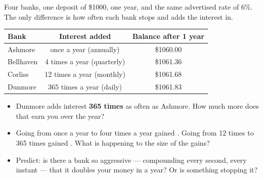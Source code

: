 \documentclass[10pt]{article}
\begin{document}
\begin{hookbox}
Four banks, one deposit of \$1000, one year, and the same advertised rate of $6\%$. The only difference
is how often each bank stops and adds the interest in.

\vspace{4pt}
\begin{center}
\small
\renewcommand{\arraystretch}{1.35}
\begin{tabular}{|l|c|c|}
\hline
\textbf{Bank} & \textbf{Interest added} & \textbf{Balance after 1 year} \\
\hline
Ashmore     & once a year (annually) & \$1060.00 \\
Bellhaven   & 4 times a year (quarterly) & \$1061.36 \\
Corliss     & 12 times a year (monthly) & \$1061.68 \\
Dunmore     & 365 times a year (daily) & \$1061.83 \\
\hline
\end{tabular}
\end{center}

\vspace{4pt}
\begin{itemize}\setlength{\itemsep}{2pt}
  \item Dunmore adds interest \textbf{365 times} as often as Ashmore. How much more does that earn you over the year? \blank{2.4cm}
  \item Going from once a year to four times a year gained \blank{1.6cm}. Going from 12 times to 365 times gained \blank{1.6cm}. What is happening to the size of the gains? \writeline
  \item Predict: is there a bank so aggressive --- compounding every second, every instant --- that it doubles your money in a year? Or is something stopping it? \writeline
\end{itemize}
\end{hookbox}
\end{document}

